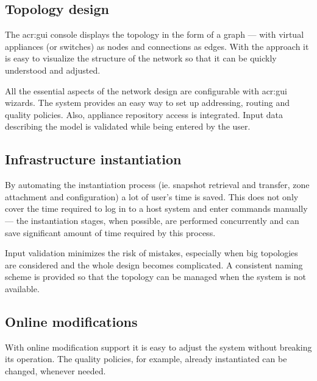 \documentclass[11pt]{book}
\begin{document}
      \subsection{Topology design}
      \label{sub:uc:enhance:design}

        The \gls{acr:gui} console displays the topology in the form of a graph --- with virtual appliances (or switches) as nodes
        and connections as edges. With the approach it is easy to visualize the structure of the network so that it can
        be quickly understood and adjusted.

        All the essential aspects of the network design are configurable with \gls{acr:gui} wizards. The system provides an easy
        way to set up addressing, routing and quality policies. Also, appliance repository access is integrated. Input
        data describing the model is validated while being entered by the user. 


      \subsection{Infrastructure instantiation}
      \label{sub:uc:enhance:instantiation}

        By automating the instantiation process (ie. snapshot retrieval and transfer, zone attachment and configuration)
        a lot of user's time is saved. This does not only cover the time required to log in to a host system and enter
        commands manually --- the instantiation stages, when possible, are performed concurrently and can save
        significant amount of time required by this process.

        Input validation minimizes the risk of mistakes, especially when big topologies are considered and the whole
        design becomes complicated. A consistent naming scheme is provided so that the topology can be managed when the
        system is not available.



      \subsection{Online modifications}
      \label{sub:uc:enhance:online}

        With online modification support it is easy to adjust the system without breaking its operation. The quality
        policies, for example, already instantiated can be changed, whenever needed.
\end{document}
